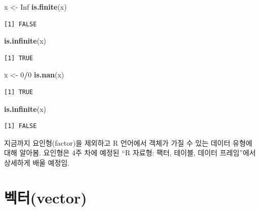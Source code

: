 \documentclass[
  11pt,
]{krantz}
\newenvironment{Shaded}{\begin{snugshade}}{\end{snugshade}}
\newcommand{\DecValTok}[1]{\textcolor[rgb]{0.06,0.06,0.06}{#1}}
\newcommand{\KeywordTok}[1]{\textcolor[rgb]{0.27,0.27,0.27}{\textbf{#1}}}
\newcommand{\NormalTok}[1]{#1}
\newcommand{\OperatorTok}[1]{\textcolor[rgb]{0.43,0.43,0.43}{\textbf{#1}}}
\newcommand{\OtherTok}[1]{\textcolor[rgb]{0.37,0.37,0.37}{#1}}
\newcommand{\StringTok}[1]{\textcolor[rgb]{0.5,0.5,0.5}{#1}}
\let\BeginKnitrBlock\begin \let\EndKnitrBlock\end
\begin{document}
\begin{Shaded}
\begin{Highlighting}[]
\NormalTok{x <-}\StringTok{ }\OtherTok{Inf}
\KeywordTok{is.finite}\NormalTok{(x)}
\end{Highlighting}
\end{Shaded}

\begin{verbatim}
[1] FALSE
\end{verbatim}

\begin{Shaded}
\begin{Highlighting}[]
\KeywordTok{is.infinite}\NormalTok{(x)}
\end{Highlighting}
\end{Shaded}

\begin{verbatim}
[1] TRUE
\end{verbatim}

\begin{Shaded}
\begin{Highlighting}[]
\NormalTok{x <-}\StringTok{ }\DecValTok{0}\OperatorTok{/}\DecValTok{0}
\KeywordTok{is.nan}\NormalTok{(x)}
\end{Highlighting}
\end{Shaded}

\begin{verbatim}
[1] TRUE
\end{verbatim}

\begin{Shaded}
\begin{Highlighting}[]
\KeywordTok{is.infinite}\NormalTok{(x)}
\end{Highlighting}
\end{Shaded}

\begin{verbatim}
[1] FALSE
\end{verbatim}

\normalsize

\footnotesize

\BeginKnitrBlock{rmdnote}
지금까지 요인형(factor)을 제외하고 R 언어에서 객체가 가질 수 있는 데이터 유형에 대해 알아봄. 요인형은 4주 차에 예정된 ``R 자료형: 팩터, 테이블, 데이터 프레임''에서 상세하게 배울 예정임.
\EndKnitrBlock{rmdnote}

\normalsize

\hypertarget{vector}{%
\section{벡터(vector)}\label{vector}}
\end{document}
